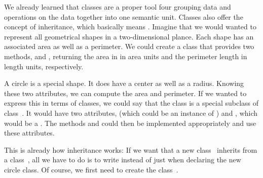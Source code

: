 %
\label{sec:inheritance}%
%
%
%
%
%
%
%
%
%
%
%
%
%
We already learned that classes are a proper tool four grouping data and operations on the data together into one semantic unit.
Classes also offer the concept of inheritance, which basically means .
Imagine that we would wanted to represent all geometrical shapes in a two-dimensional plance.
Each shape has an associated area as well as a perimeter.
We could create a class  that provides two methods,  and , returning the area in in area units and the perimeter length in length units, respectively.

A circle is a special shape.
It does have a center as well as a radius.
Knowing these two attributes, we can compute the area and perimeter.
If we wanted to express this in terms of classes, we could say that the class  is a special subclass of class~.
It would have two attributes,  (which could be an instance of ) and , which would be a .
The methods  and  could then be implemented appropriately and use these attributes.

This is already how inheritance works:
If we want that a new class~ inherits from a class~, all we have to do is to write  instead of just  when declaring the new circle class.
Of course, we first need to create the class~.

